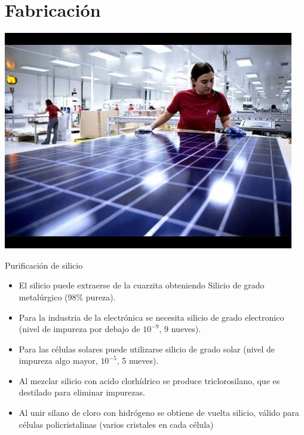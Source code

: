 \documentclass[xcolor={usenames,svgnames,dvipsnames}]{beamer}
\begin{document}
\section{Fabricación}
\label{sec-4}

\begin{frame}[label=sec-4-0-1]{}
\href{http://youtu.be/fZ1SC-vUe_I?t\%3D31s}{\includegraphics[width=.9\linewidth]{../figs/solar_cell_manufacturing_video.jpg}}
\end{frame}

\begin{frame}[label=sec-4-0-2]{Purificación de silicio}
\begin{itemize}
\item El silicio puede extraerse de la cuarzita obteniendo Silicio de grado metalúrgico (98\% pureza).

\item Para la industria de la electrónica se necesita silicio de grado electronico (nivel de impureza por debajo de $10^{-9}$, 9 nueves).

\item Para las células solares puede utilizarse silicio de grado solar (nivel de impureza algo mayor, $10^{-5}$, 5 nueves).

\item Al mezclar silicio con acido clorhídrico se produce triclorosilano, que es destilado para eliminar impurezas.

\item Al unir silano de cloro con hidrógeno se obtiene de vuelta silicio, válido para células policristalinas (varios cristales en cada célula)
\end{itemize}
\end{frame}
\end{document}
